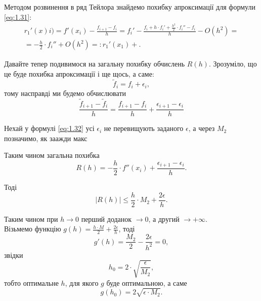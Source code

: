 \begin{solution}
	Методом розвинення в ряд Тейлора знайдемо похибку апроксимації для формули \eqref{eq:1.31}:
	\begin{multline*}
		r_1'(x)i) = f'(x_i) - \frac{f_{i + 1} - f_i}{h} = f_i' - \frac{f_i + h \cdot f_i' + \frac{h^2}{2} \cdot f_i'' - f_i}{h} - O (h^2) = \\ = -\frac{h}{2} \cdot f_i'' + O(h^2) =: r_1'(x_1) + .
	\end{multline*}

	Давайте тепер подивимося на загальну похибку обчислень $R(h)$. Зрозуміло, що це буде похибка апроксимації і ще щось, а саме:
	\begin{equation*}
		\tilde f_i = f_i + \epsilon_i,
	\end{equation*}
	тому насправді ми будемо обчислювати
	\begin{equation}
		\label{eq:1.32}
		\frac{\tilde f_{i + 1} - \tilde f_i}{h} = \frac{f_{i + 1} - f_i}{h} + \frac{\epsilon_{i + 1} - \epsilon_i}{h}
	\end{equation}

	Нехай у формулі \eqref{eq:1.32} усі $\epsilon_i$ не перевищують заданого $\epsilon$, а через $M_2$ позначимо, як заажди макс

	Таким чином загальна похибка 
	\begin{equation}
		\label{eq:1.33}
		R(h) = - \frac{h}{2} \cdot f''(x_i) + \frac{\epsilon_{i + 1} - \epsilon_i}{h}.
	\end{equation}

	Тоді
	\begin{equation}
		\label{eq:1.34}
		| R(h) | \le \frac{h}{2} \cdot M_2 + \frac{2 \epsilon}{h}.
	\end{equation}

	Таким чином при $h \to 0$ перший доданок $\to 0$, а другий $\to +  \infty$. \\

	Візьмемо функцію $g(h) = \frac{h \cdot M}{2} + \frac{2 \epsilon}{h}$, тоді
	\begin{equation*}
		g'(h) = \frac{M_2}{2} - \frac{2 \epsilon}{h^2} = 0,
	\end{equation*}
	звідки
	\begin{equation*}
		h_0 = 2 \cdot \sqrt{ \frac{\epsilon}{M_2} },
	\end{equation*}
	тобто оптимальне $h$, для якого $g$ буде оптимальною, а саме
	\begin{equation}
		\label{eq:1.35}
		g(h_0) = 2 \sqrt{\epsilon \cdot M_2}.
	\end{equation}
\end{solution}

